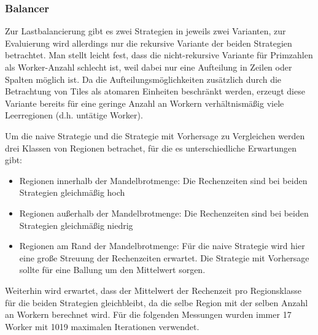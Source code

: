 \subsubsection{Balancer}
Zur Lastbalancierung gibt es zwei Strategien in jeweils zwei Varianten, zur Evaluierung wird allerdings nur die rekursive Variante der beiden Strategien betrachtet.
Man stellt leicht fest, dass die nicht-rekursive Variante für Primzahlen als Worker-Anzahl schlecht ist, weil dabei nur eine Aufteilung in Zeilen oder Spalten möglich ist.
Da die Aufteilungsmöglichkeiten zusätzlich durch die Betrachtung von Tiles als atomaren Einheiten beschränkt werden, erzeugt diese Variante bereits für eine geringe Anzahl an Workern verhältnismäßig viele Leerregionen (d.h. untätige Worker).

Um die naive Strategie und die Strategie mit Vorhersage zu Vergleichen werden drei Klassen von Regionen betrachet, für die es unterschiedliche Erwartungen gibt:

\begin{itemize}
	\item Regionen innerhalb der Mandelbrotmenge: Die Rechenzeiten sind bei beiden Strategien gleichmäßig hoch
	\item Regionen außerhalb der Mandelbrotmenge: Die Rechenzeiten sind bei beiden Strategien gleichmäßig niedrig
	\item Regionen am Rand der Mandelbrotmenge: Für die naive Strategie wird hier eine große Streuung der Rechenzeiten erwartet. Die Strategie mit Vorhersage sollte für eine Ballung um den Mittelwert sorgen.
\end{itemize}

Weiterhin wird erwartet, dass der Mittelwert der Rechenzeit pro Regionsklasse für die beiden Strategien gleichbleibt, da die selbe Region mit der selben Anzahl an Workern berechnet wird.
Für die folgenden Messungen wurden immer 17 Worker mit 1019 maximalen Iterationen verwendet.


